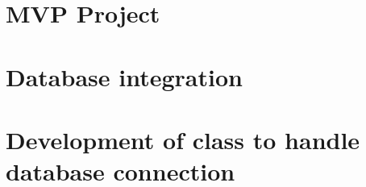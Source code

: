 \documentclass[../main.tex]{subfiles}
\begin{document}
\section{MVP Project}
\section{Database integration}
\section{Development of class to handle database connection}
\cleardoublepage
\end{document}
